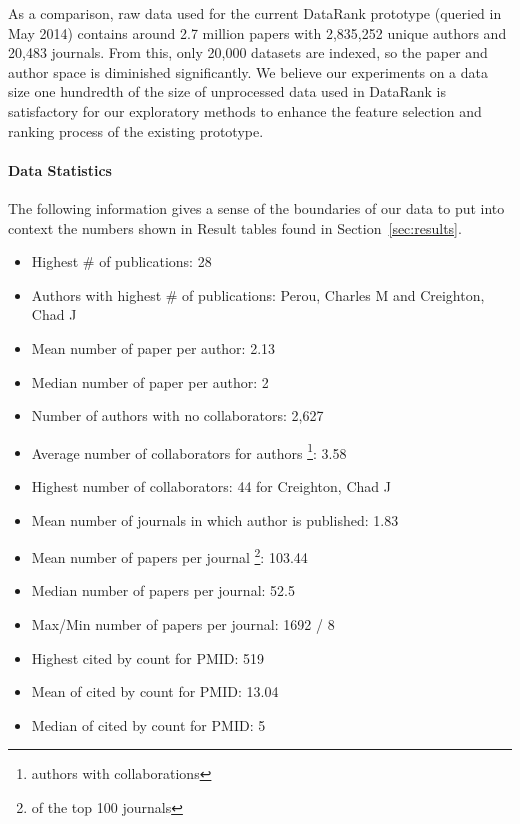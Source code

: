 As a comparison, raw data used for the current DataRank prototype (queried in May 2014) contains around 2.7 million papers with 2,835,252 unique authors and 20,483 journals. From this, only 20,000 datasets are indexed, so the paper and author space is diminished significantly. We believe our experiments on a data size one hundredth of the size of unprocessed data used in DataRank is satisfactory for our exploratory methods to enhance the feature selection and ranking process of the existing prototype.

\paragraph{Data Statistics}
The following information gives a sense of the boundaries of our data to put into context the numbers shown in Result tables found in Section~\ref{sec:results}.

\begin{itemize}[noitemsep,nolistsep]
    \item Highest \# of publications: 28
    \item Authors with highest \# of publications: Perou, Charles M and Creighton, Chad J
    \item Mean number of paper per author: 2.13
    \item Median number of paper per author: 2
    \item Number of authors with no collaborators: 2,627
    \item Average number of collaborators for authors \footnote{authors with collaborations}: 3.58
    \item Highest number of collaborators: 44 for Creighton, Chad J
    \item Mean number of journals in which author is published: 1.83
    \item Mean number of papers per journal \footnote{of the top 100 journals}: 103.44
    \item Median number of papers per journal: 52.5
    \item Max/Min number of papers per journal: 1692 / 8
    \item Highest cited by count for PMID: 519
    \item Mean of cited by count for PMID: 13.04
    \item Median of cited by count for PMID: 5
\end{itemize}

